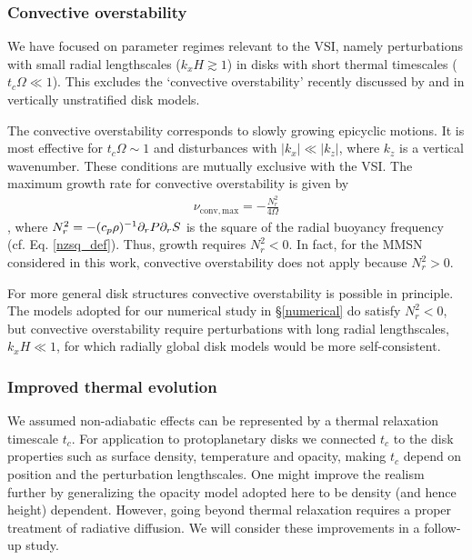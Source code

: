 \subsubsection{Convective overstability}
We have focused on parameter regimes relevant to the VSI,
namely perturbations with small radial lengthscales 
($k_xH\gtrsim 1$) in disks with short thermal timescales
($t_c\Omega\ll 1$). This excludes the `convective overstability'
recently discussed by \cite{klahr14} and \cite{lyra14} in vertically
unstratified disk models.   

The convective overstability corresponds to slowly growing epicyclic motions.
It is most effective for $t_c\Omega \sim 1$ and disturbances with
$|k_x|\ll |k_z|$, where $k_z$ is a vertical wavenumber. These
conditions are mutually exclusive with the VSI.  
The maximum growth rate for convective overstability is given by 
\begin{align}
  \nu_\mathrm{conv,max} = -\frac{N^2_r}{4\Omega}\label{max_conv_gen}
\end{align}
\citep{lyra14}, where $N_r^2 = -(c_p\rho)^{-1}\partial_rP\partial_rS$ is the
square of the radial buoyancy frequency
(cf. Eq. \ref{nzsq_def}). Thus, growth requires $N_r^2<0$.  
In fact, for the MMSN considered in this work, convective
overstability does not apply because 
$N_r^2>0$.   

For more general disk structures convective overstability is
possible in principle. The models adopted for our numerical study in
\S\ref{numerical} do satisfy $N_r^2<0$, but convective overstability
require perturbations with long radial lengthscales,
$k_xH\ll 1$, for which radially global disk models would be more 
self-consistent. 

\subsubsection{Improved thermal evolution} 
We assumed non-adiabatic effects can be represented by a thermal
relaxation timescale $t_c$. For  
application to protoplanetary disks we connected $t_c$ to the disk
properties such as surface density, temperature and opacity, making
$t_c$ depend on position and the perturbation 
lengthscales. One might improve the realism further by generalizing
the opacity model adopted here to be density (and hence height)
dependent.  
However, going beyond thermal relaxation requires a
proper treatment of radiative diffusion. %
We will consider these improvements in a
follow-up study. %
 
